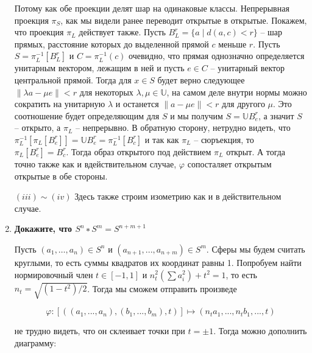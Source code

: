 \documentclass{article}
\begin{document}
\begin{enumerate}
        Потому как обе проекции делят шар на одинаковые классы. Непрерывная
        проекция $\pi_S$, как мы видели ранее переводит открытые в открытые.
        Покажем, что проекция $\pi_L$ действует также. Пусть $B^r_L=\{a\;|\;
        d(a,c)<r\}$ – шар прямых, расстояние которых до выделенной прямой $c$
        меньше $r$. Пусть $S=\pi_L^{-1}[B^r_L]$ и $C=\pi_L^{-1}(c)$ очевидно,
        что прямая однозначно определяется унитарным вектором, лежащим в ней и
        пусть $e\in C$ – унитарный вектор центральной прямой. Тогда для $x\in S$
        будет верно следующее $\|\lambda a - \mu e\|<r$ для некоторых $\lambda,
        \mu\in\mathbb{U}$, на самом деле внутри нормы можно сократить на
        унитарную $\lambda$ и останется $\|a -\mu e\|<r$ для другого $\mu$.
        Это соотношение будет определяющим для $S$ и мы получим
        $S=\mathbb{U}B^r_e$, а значит $S$ – открыто, а $\pi_L$ – непрерывно.
        В обратную сторону, нетрудно видеть, что $\pi_L^{-1}[\pi_L[B^r_e]]=
        \mathbb{U}B^r_e=\pi_L^{-1}[B^r_c]$ и так как $\pi_L$ – сюръекция, то
        $\pi_L[B^r_e]=B^r_c$. Тогда образ открытого под действием $\pi_L$
        открыт. А тогда точно также как и вдействительном случае, $\varphi$
        сопосталяет открытым открытые в обе стороны.

        $(iii)\sim(iv)$ Здесь также строим изометрию как и в действительном
        случае.

    \item \textbf{Докажите, что $S^n ∗ S^m = S^{n+m+1}$}

        Пусть $(a_1,\ldots,a_n)\in S^n$ и $(a_{n+1},...,a_{n+m})\in S^m$. Сферы
        мы будем считать круглыми, то есть суммы квадратов их координат равны 1.
        Попробуем найти нормировочный член $t\in[-1,1]$ и $n_t^2(\sum a_i^2)+
        t^2=1$, то есть $n_t = \sqrt{(1-t^2)/2}$. Тогда мы сможем отправить
        произведе

        \[\varphi: [((a_1,...,a_n), (b_1,...,b_m), t)]\mapsto (n_ta_1,...,n_tb_1,
        ..., t)\]

        не трудно видеть, что он склеивает точки при $t=\pm 1$. Тогда можно
        дополнить диаграмму:

        \begin{center}
        \end{center}


\end{enumerate}
\end{document}
